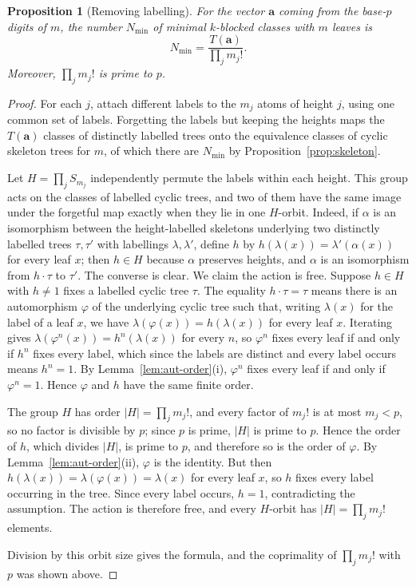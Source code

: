 \documentclass[11pt]{amsart}
\newtheorem{proposition}[theorem]{Proposition}
\theoremstyle{definition}
\theoremstyle{remark}
\begin{document}
\begin{proposition}[Removing labelling]\label{prop:free}
For the vector $\mathbf a$ coming from the base-$p$ digits of $m$, the number $N_{\min}$ of minimal $k$-blocked classes with $m$ leaves is
\[
 N_{\min}=\frac{T(\mathbf a)}{\prod_jm_j!}.
\]
Moreover, $\prod_jm_j!$ is prime to $p$.
\end{proposition}
\begin{proof}
For each $j$, attach different labels to the $m_j$ atoms of height $j$, using one common set of labels.  Forgetting the labels but keeping the heights maps the $T(\mathbf a)$ classes of distinctly labelled trees onto the equivalence classes of cyclic skeleton trees for $m$, of which there are $N_{\min}$ by Proposition~\ref{prop:skeleton}.

Let $H=\prod_jS_{m_j}$ independently permute the labels within each height.  This group acts on the classes of labelled cyclic trees, and two of them have the same image under the forgetful map exactly when they lie in one $H$-orbit.  Indeed, if $\alpha$ is an isomorphism between the height-labelled skeletons underlying two distinctly labelled trees $\tau,\tau'$ with labellings $\lambda,\lambda'$, define $h$ by $h(\lambda(x))=\lambda'(\alpha(x))$ for every leaf $x$; then $h\in H$ because $\alpha$ preserves heights, and $\alpha$ is an isomorphism from $h\cdot\tau$ to $\tau'$.  The converse is clear.  We claim the action is free.  Suppose $h\in H$ with $h\ne1$ fixes a labelled cyclic tree $\tau$.  The equality $h\cdot\tau=\tau$ means there is an automorphism $\varphi$ of the underlying cyclic tree such that, writing $\lambda(x)$ for the label of a leaf $x$, we have $\lambda(\varphi(x))=h(\lambda(x))$ for every leaf $x$.  Iterating gives $\lambda(\varphi^n(x))=h^n(\lambda(x))$ for every $n$, so $\varphi^n$ fixes every leaf if and only if $h^n$ fixes every label, which since the labels are distinct and every label occurs means $h^n=1$.  By Lemma~\ref{lem:aut-order}(i), $\varphi^n$ fixes every leaf if and only if $\varphi^n=1$.  Hence $\varphi$ and $h$ have the same finite order.

The group $H$ has order $|H|=\prod_jm_j!$, and every factor of $m_j!$ is at most $m_j<p$, so no factor is divisible by $p$; since $p$ is prime, $|H|$ is prime to $p$.  Hence the order of $h$, which divides $|H|$, is prime to $p$, and therefore so is the order of $\varphi$.  By Lemma~\ref{lem:aut-order}(ii), $\varphi$ is the identity.  But then $h(\lambda(x))=\lambda(\varphi(x))=\lambda(x)$ for every leaf $x$, so $h$ fixes every label occurring in the tree.  Since every label occurs, $h=1$, contradicting the assumption.  The action is therefore free, and every $H$-orbit has $|H|=\prod_jm_j!$ elements.

Division by this orbit size gives the formula, and the coprimality of $\prod_jm_j!$ with $p$ was shown above.
\end{proof}
\end{document}
